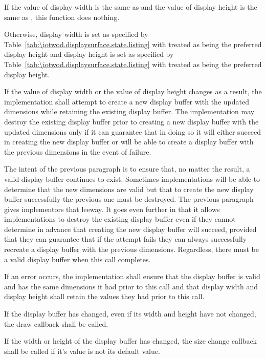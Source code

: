\begin{itemdescr}
\pnum
\effects
If the value of display width is the same as  and the value of display height is the same as , this function does nothing.

\pnum
Otherwise, display width is set as specified by Table~\ref{tab:\iotwod.displaysurface.state.listing} with  treated as being the preferred display height and display height is set as specified by Table~\ref{tab:\iotwod.displaysurface.state.listing} with  treated as being the preferred display height.

\pnum
If the value of display width or the value of display height changes as a result, the implementation shall attempt to create a new display buffer with the updated dimensions while retaining the existing display buffer. The implementation may destroy the existing display buffer prior to creating a new display buffer with the updated dimensions only if it can guarantee that in doing so it will either succeed in creating the new display buffer or will be able to create a display buffer with the previous dimensions in the event of failure.

\pnum
\begin{note}
The intent of the previous paragraph is to ensure that, no matter the result, a valid display buffer continues to exist. Sometimes implementations will be able to determine that the new dimensions are valid but that to create the new display buffer successfully the previous one must be destroyed. The previous paragraph gives implementors that leeway. It goes even further in that it allows implementations to destroy the existing display buffer even if they cannot determine in advance that creating the new display buffer will succeed, provided that they can guarantee that if the attempt fails they can always successfully recreate a display buffer with the previous dimensions. Regardless, there must be a valid display buffer when this call completes.
\end{note}

\pnum
If an error occurs, the implementation shall ensure that the display buffer is valid and has the same dimensions it had prior to this call and that display width and display height shall retain the values they had prior to this call.

\pnum
If the display buffer has changed, even if its width and height have not changed, the draw callback shall be called.

\pnum
If the width or height of the display buffer has changed, the size change callback shall be called if it's value is not its default value.


\end{itemdescr}
